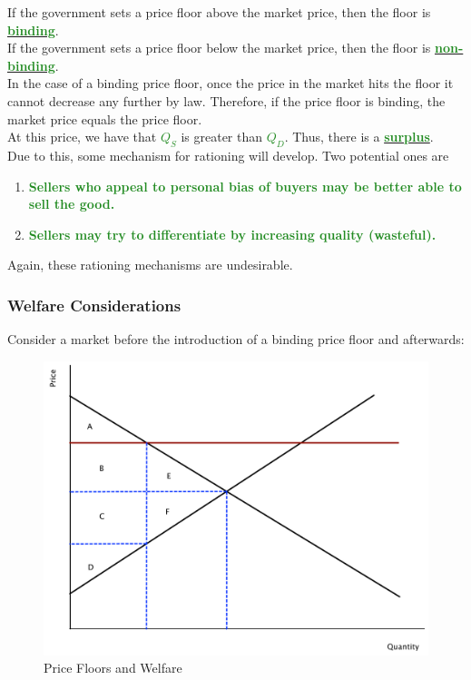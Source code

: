 \documentclass[11pt]{article}\usepackage[]{graphicx}\usepackage[]{color}
\theoremstyle{definition}
\newcommand{\ddp}[1]{{\textbf{\textcolor{ForestGreen}{#1}}}}
\newcommand{\dd}[1]{{\underline{\textbf{\textcolor{ForestGreen}{#1}}}}}
\begin{document}
	
	If the government sets a price floor above the market price, then the floor is \dd{binding}.
	\\
	
	If the government sets a price floor below the market price, then the floor is \dd{non-binding}.
	\\
	
	In the case of a binding price floor, once the price in the market hits the floor it cannot decrease any further by law. Therefore, if the price floor is binding, the market price equals the price floor.
	\\
	
	At this price, we have that \dd{$Q_S$} is greater than \dd{$Q_D$}. Thus, there is a \dd{surplus}.
	\\
	
	Due to this, some mechanism for rationing will develop. Two potential ones are
	\begin{enumerate}
		\setlength{\itemsep}{15pt}
		\item \ddp{Sellers who appeal to personal bias of buyers may be better able to sell the good.}
		\item \ddp{Sellers may try to differentiate by increasing quality (wasteful).}
	\end{enumerate}
	\vspace{10pt}
	
	Again, these rationing mechanisms are undesirable.
	\\
	
	\subsubsection*{Welfare Considerations}
	
	
	Consider a market before the introduction of a binding price floor and afterwards:
	
		\begin{figure}[H]
			\centering
			\includegraphics[scale=.40]{plot37.pdf}
			\caption{Price Floors and Welfare}
		\end{figure}
		
\end{document}
